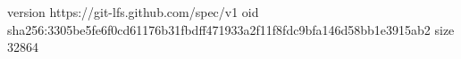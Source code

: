 version https://git-lfs.github.com/spec/v1
oid sha256:3305be5fe6f0cd61176b31fbdff471933a2f11f8fdc9bfa146d58bb1e3915ab2
size 32864
